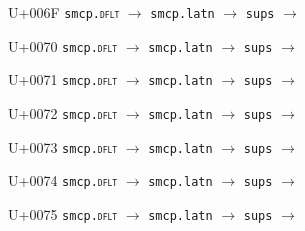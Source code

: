 \documentclass{article}
\begin{document}
\begin{substitutions}
\goodbreak

U+006F  \linebreak
    \texttt{smcp.\textsc{dflt}} $\to$  \linebreak
    \texttt{smcp.latn} $\to$  \linebreak
    \texttt{sups} $\to$  

\goodbreak

U+0070  \linebreak
    \texttt{smcp.\textsc{dflt}} $\to$  \linebreak
    \texttt{smcp.latn} $\to$  \linebreak
    \texttt{sups} $\to$  

\goodbreak

U+0071  \linebreak
    \texttt{smcp.\textsc{dflt}} $\to$  \linebreak
    \texttt{smcp.latn} $\to$  \linebreak
    \texttt{sups} $\to$  

\goodbreak

U+0072  \linebreak
    \texttt{smcp.\textsc{dflt}} $\to$  \linebreak
    \texttt{smcp.latn} $\to$  \linebreak
    \texttt{sups} $\to$  

\goodbreak

U+0073  \linebreak
    \texttt{smcp.\textsc{dflt}} $\to$  \linebreak
    \texttt{smcp.latn} $\to$  \linebreak
    \texttt{sups} $\to$  

\goodbreak

U+0074  \linebreak
    \texttt{smcp.\textsc{dflt}} $\to$  \linebreak
    \texttt{smcp.latn} $\to$  \linebreak
    \texttt{sups} $\to$  

\goodbreak

U+0075  \linebreak
    \texttt{smcp.\textsc{dflt}} $\to$  \linebreak
    \texttt{smcp.latn} $\to$  \linebreak
    \texttt{sups} $\to$  


\end{substitutions}
\end{document}
